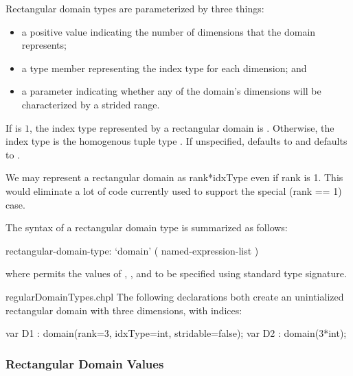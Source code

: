 Rectangular domain types are parameterized by three things:
\begin{itemize}
\item {} a positive  value indicating the number
of dimensions that the domain represents;
\item {} a type member representing the index type for
each dimension; and
\item {} a  parameter indicating whether
any of the domain's dimensions will be characterized by a strided
range.
\end{itemize}
If  is $1$, the index type represented by a rectangular
domain is .  Otherwise, the index type is the homogenous
tuple type .
If unspecified,  defaults
to  and  defaults to .

\begin{openissue}
We may represent a rectangular domain as rank*idxType even if rank is 1.  This
would eliminate a lot of code currently used to support the special (rank == 1) case.
\end{openissue}

The syntax of a rectangular domain type is summarized as follows:
\begin{syntax}
rectangular-domain-type:
  `domain' ( named-expression-list )
\end{syntax}

\noindent where  permits the values of
, , and  to be specified
using standard type signature.

\begin{chapelexample}{regularDomainTypes.chpl}
The following declarations both create an unintialized rectangular domain with three dimensions, with  indices:
\begin{chapel}
var D1 : domain(rank=3, idxType=int, stridable=false);
var D2 : domain(3*int);
\end{chapel}
\begin{chapeloutput}
\end{chapeloutput}
\end{chapelexample}

\subsubsection{Rectangular Domain Values}
\label{Rectangular_Domain_Values}

